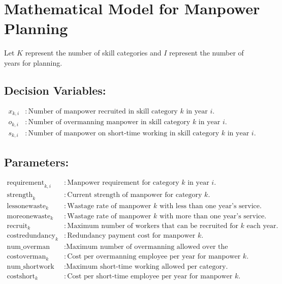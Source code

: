 \documentclass{article}
\begin{document}
\section*{Mathematical Model for Manpower Planning}

Let \( K \) represent the number of skill categories and \( I \) represent the number of years for planning.

\subsection*{Decision Variables:}

\begin{align*}
x_{k,i} & : \text{Number of manpower recruited in skill category } k \text{ in year } i. \\
o_{k,i} & : \text{Number of overmanning manpower in skill category } k \text{ in year } i. \\
s_{k,i} & : \text{Number of manpower on short-time working in skill category } k \text{ in year } i.
\end{align*}

\subsection*{Parameters:}

\begin{align*}
\text{requirement}_{k,i} & : \text{Manpower requirement for category } k \text{ in year } i. \\
\text{strength}_k & : \text{Current strength of manpower for category } k. \\
\text{lessonewaste}_k & : \text{Wastage rate of manpower } k \text{ with less than one year's service.} \\
\text{moreonewaste}_k & : \text{Wastage rate of manpower } k \text{ with more than one year's service.} \\
\text{recruit}_k & : \text{Maximum number of workers that can be recruited for } k \text{ each year.} \\
\text{costredundancy}_k & : \text{Redundancy payment cost for manpower } k. \\
\text{num\_overman} & : \text{Maximum number of overmanning allowed over the company.} \\
\text{costoverman}_k & : \text{Cost per overmanning employee per year for manpower } k. \\
\text{num\_shortwork} & : \text{Maximum short-time working allowed per category.} \\
\text{costshort}_k & : \text{Cost per short-time employee per year for manpower } k.
\end{align*}
\end{document}
